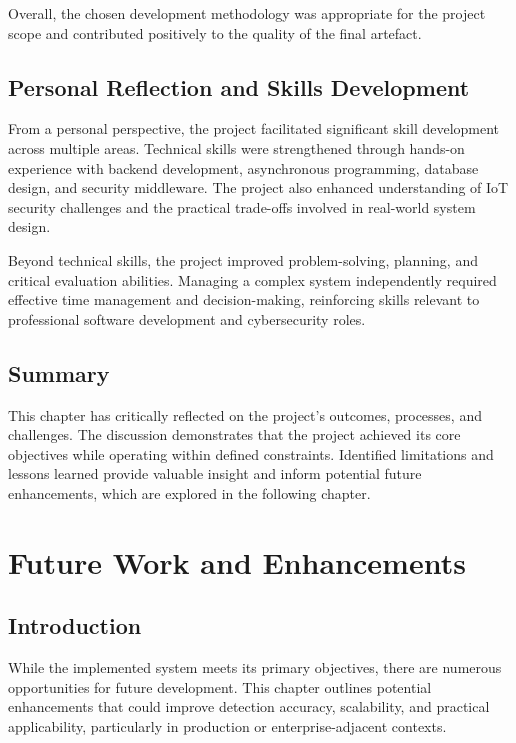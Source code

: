 Overall, the chosen development methodology was appropriate for the project scope and contributed positively to the quality of the final artefact.

\section{Personal Reflection and Skills Development}

From a personal perspective, the project facilitated significant skill development across multiple areas. Technical skills were strengthened through hands-on experience with backend development, asynchronous programming, database design, and security middleware. The project also enhanced understanding of IoT security challenges and the practical trade-offs involved in real-world system design.

Beyond technical skills, the project improved problem-solving, planning, and critical evaluation abilities. Managing a complex system independently required effective time management and decision-making, reinforcing skills relevant to professional software development and cybersecurity roles.

\section{Summary}

This chapter has critically reflected on the project's outcomes, processes, and challenges. The discussion demonstrates that the project achieved its core objectives while operating within defined constraints. Identified limitations and lessons learned provide valuable insight and inform potential future enhancements, which are explored in the following chapter.

\chapter{Future Work and Enhancements}

\section{Introduction}

While the implemented system meets its primary objectives, there are numerous opportunities for future development. This chapter outlines potential enhancements that could improve detection accuracy, scalability, and practical applicability, particularly in production or enterprise-adjacent contexts.

